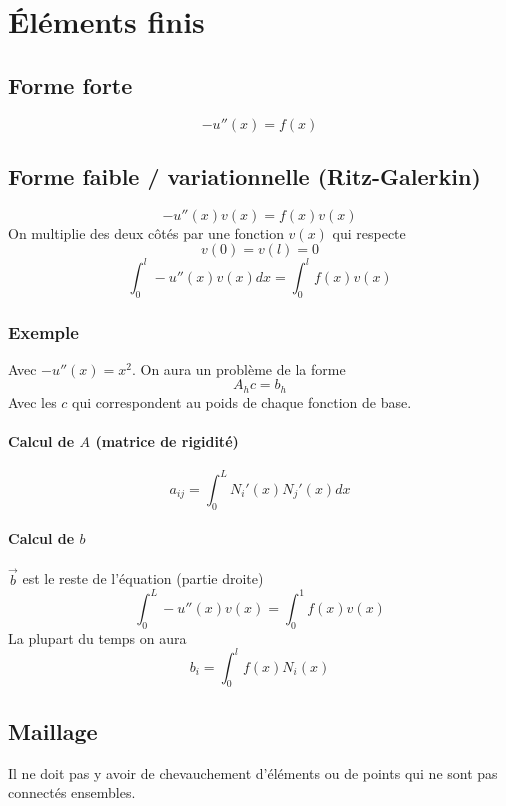 \documentclass[resume]{subfiles}
\begin{document}
\section{Éléments finis}
\subsection{Forme forte}
$$-u''(x)=f(x)$$
\subsection{Forme faible / variationnelle (Ritz-Galerkin)}
$$-u''(x)v(x)=f(x)v(x)$$
On multiplie des deux côtés par une fonction $v(x)$ qui respecte
$$v(0)=v(l)=0$$
$$\int_{0}^{l}-u''(x)v(x)dx=\int_{0}^{l}f(x)v(x)$$
\subsubsection{Exemple}
Avec $-u''(x)=x^2$. On aura un problème de la forme
$$\boxed{A_hc=b_h}$$
Avec les $c$ qui correspondent au poids de chaque fonction de base.
\paragraph{Calcul de $A$ (matrice de rigidité)}
$$\boxed{a_{ij}=\int_{0}^{L}N_i'(x)N_j'(x)dx}$$
\paragraph{Calcul de $b$}
$\vec{b}$ est le reste de l'équation (partie droite)
$$\int_{0}^{L}-u''(x)v(x)=\int_{0}^{1}f(x)v(x)$$
La plupart du temps on aura
$$\boxed{b_i=\int_{0}^{l}f(x)N_i(x)}$$
\subsection{Maillage}
Il ne doit pas y avoir de chevauchement d'éléments ou de points qui ne sont pas connectés ensembles.
\end{document}
